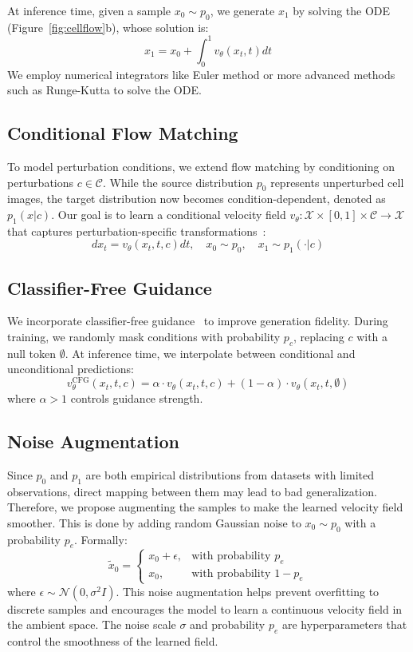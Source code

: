 At inference time, given a sample $x_0 \sim p_0$, we generate $x_1$ by solving the ODE (Figure~\ref{fig:cellflow}b), whose solution is:
\[
x_1 = x_0 + \int_0^1 v_\theta(x_t, t)dt
\]
We employ numerical integrators like Euler method or more advanced methods such as Runge-Kutta to solve the ODE.

\subsection{Conditional Flow Matching}

To model perturbation conditions, we extend flow matching by conditioning on perturbations $c \in \mathcal{C}$. While the source distribution $p_0$ represents unperturbed cell images, the target distribution now becomes condition-dependent, denoted as $p_1(x|c)$. Our goal is to learn a conditional velocity field $v_\theta: \mathcal{X} \times [0,1] \times \mathcal{C} \rightarrow \mathcal{X}$ that captures perturbation-specific transformations~\cite{esser2024scaling}:
\[
{dx_t} = v_\theta(x_t, t, c) {dt}, \quad x_0 \sim p_0, \quad x_1 \sim p_1(\cdot|c)
\]

\subsection{Classifier-Free Guidance}

We incorporate classifier-free guidance~\cite{ho2022classifier} to improve generation fidelity. During training, we randomly mask conditions with probability $p_c$, replacing $c$ with a null token $\emptyset$. At inference time, we interpolate between conditional and unconditional predictions:
\[
v_\theta^{\text{CFG}}(x_t, t, c) = \alpha \cdot v_\theta(x_t, t, c) + (1-\alpha) \cdot v_\theta(x_t, t, \emptyset)
\]
where $\alpha > 1$ controls guidance strength. 

\subsection{Noise Augmentation}
Since $p_0$ and $p_1$ are both empirical distributions from datasets with limited observations, direct mapping between them may lead to bad generalization. Therefore, we propose augmenting the samples to make the learned velocity field smoother. This is done by adding random Gaussian noise to $x_0 \sim p_0$ with a probability $p_e$. Formally:
\[ \tilde{x}_0 = \begin{cases} 
x_0 + \epsilon, & \text{with probability } p_e \\
x_0, & \text{with probability } 1-p_e
\end{cases} \]
where $\epsilon \sim \mathcal{N}(0, \sigma^2I)$. This noise augmentation helps prevent overfitting to discrete samples and encourages the model to learn a continuous velocity field in the ambient space. The noise scale $\sigma$ and probability $p_e$ are hyperparameters that control the smoothness of the learned field.

